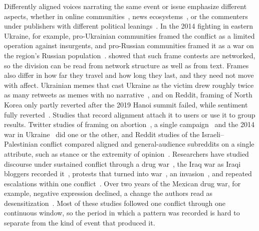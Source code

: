 Differently aligned voices narrating the same event or issue emphasize different aspects, whether in online communities~\cite{makhortykh2017visual}, news ecosystems~\cite{hanley2023specialoperation}, or the commenters under publishers with different political leanings~\cite{rho2018metoo}. In the 2014 fighting in eastern Ukraine, for example, pro-Ukrainian communities framed the conflict as a limited operation against insurgents, and pro-Russian communities framed it as a war on the region's Russian population~\cite{makhortykh2017visual}. \citet{stewart2017lines} showed that such frame contests are networked, so the division can be read from network structure as well as from text. Frames also differ in how far they travel and how long they last, and they need not move with affect. Ukrainian memes that cast Ukraine as the victim drew roughly twice as many retweets as memes with no narrative~\cite{mejova2025narratives}, and on Reddit, framing of North Korea only partly reverted after the 2019 Hanoi summit failed, while sentiment fully reverted~\cite {shin2026diplomacy}. Studies that record alignment attach it to users or use it to group results. Twitter studies of framing on abortion~\cite{rao2025abortion}, a single campaign~\cite{panda2026framing} and the 2014 war in Ukraine~\cite{muradahmed2026ukraine} did one or the other, and Reddit studies of the Israeli--Palestinian conflict compared aligned and general-audience subreddits on a single attribute, such as stance or the extremity of opinion~\cite{ali2025stance,guerra2024extreme}. Researchers have studied discourse under sustained conflict through a drug war~\cite{dechoudhury2014narco}, the Iraq war as Iraqi bloggers recorded it~\cite{mark2012wardiary,alani2010blogging}, protests that turned into war~\cite{greger2025protests}, an invasion~\cite{corso2024longitudinal}, and repeated escalations within one conflict~\cite{zafeiropoulos2026telegram}. Over two years of the Mexican drug war, for example, negative expression declined, a change the authors read as desensitization~\cite{dechoudhury2014narco}. Most of these studies followed one conflict through one continuous window, so the period in which a pattern was recorded is hard to separate from the kind of event that produced it.

